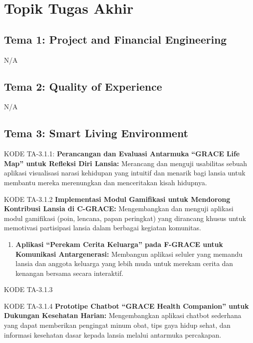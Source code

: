 \documentclass[
  letterpaper,
  DIV=11,
  numbers=noendperiod]{scrreprt}
\providecommand{\tightlist}{%
  \setlength{\itemsep}{0pt}\setlength{\parskip}{0pt}}
\begin{document}

\chapter{Topik Tugas Akhir}\label{topik-tugas-akhir}

\section{Tema 1: Project and Financial
Engineering}\label{tema-1-project-and-financial-engineering-2}

N/A

\section{Tema 2: Quality of
Experience}\label{tema-2-quality-of-experience-2}

N/A

\section{Tema 3: Smart Living
Environment}\label{tema-3-smart-living-environment-2}

KODE TA-3.1.1: \textbf{Perancangan dan Evaluasi Antarmuka ``GRACE Life
Map'' untuk Refleksi Diri Lansia:} Merancang dan menguji usabilitas
sebuah aplikasi visualisasi narasi kehidupan yang intuitif dan menarik
bagi lansia untuk membantu mereka merenungkan dan menceritakan kisah
hidupnya.

KODE TA-3.1.2 \textbf{Implementasi Modul Gamifikasi untuk Mendorong
Kontribusi Lansia di C-GRACE:} Mengembangkan dan menguji aplikasi modul
gamifikasi (poin, lencana, papan peringkat) yang dirancang khusus untuk
memotivasi partisipasi lansia dalam berbagai kegiatan komunitas.

\begin{enumerate}
\def\labelenumi{\arabic{enumi}.}
\setcounter{enumi}{2}
\tightlist
\item
  \textbf{Aplikasi ``Perekam Cerita Keluarga'' pada F-GRACE untuk
  Komunikasi Antargenerasi:} Membangun aplikasi seluler yang memandu
  lansia dan anggota keluarga yang lebih muda untuk merekam cerita dan
  kenangan bersama secara interaktif.
\end{enumerate}

KODE TA-3.1.3

KODE TA-3.1.4 \textbf{Prototipe Chatbot ``GRACE Health Companion'' untuk
Dukungan Kesehatan Harian:} Mengembangkan aplikasi chatbot sederhana
yang dapat memberikan pengingat minum obat, tips gaya hidup sehat, dan
informasi kesehatan dasar kepada lansia melalui antarmuka percakapan.
\end{document}
